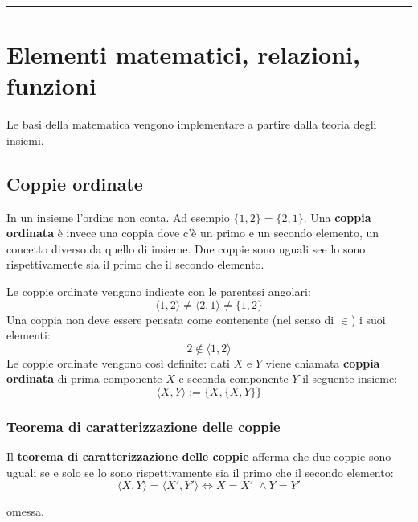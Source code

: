 \documentclass[
  a4paper,
]{article}
\begin{document}
\par\noindent\rule{\linewidth}{0.4pt}\par\vspace{6pt}

\newpage

\hypertarget{elementi-matematici-relazioni-funzioni}{%
\section{Elementi matematici, relazioni,
funzioni}\label{elementi-matematici-relazioni-funzioni}}

Le basi della matematica vengono implementare a partire dalla teoria
degli insiemi.

\hypertarget{coppie-ordinate}{%
\subsection{Coppie ordinate}\label{coppie-ordinate}}

In un insieme l'ordine non conta. Ad esempio \(\{1, 2\} = \{2, 1\}\).
Una \textbf{coppia ordinata} è invece una coppia dove c'è un primo e un
secondo elemento, un concetto diverso da quello di insieme. Due coppie
sono uguali see lo sono rispettivamente sia il primo che il secondo
elemento.

Le coppie ordinate vengono indicate con le parentesi angolari: \[
\langle 1, 2 \rangle \not = \langle 2, 1 \rangle \not = \{1, 2\}
\] Una coppia non deve essere pensata come contenente (nel senso di
\(\in\)) i suoi elementi: \[
2 \not \in \langle 1, 2 \rangle
\] Le coppie ordinate vengono così definite: dati \(X\) e \(Y\) viene
chiamata \textbf{coppia ordinata} di prima componente \(X\) e seconda
componente \(Y\) il seguente insieme: \[
\langle X, Y \rangle := \{X, \{X, Y\}\}
\]

\hypertarget{teorema-di-caratterizzazione-delle-coppie}{%
\subsubsection{Teorema di caratterizzazione delle
coppie}\label{teorema-di-caratterizzazione-delle-coppie}}

Il \textbf{teorema di caratterizzazione delle coppie} afferma che due
coppie sono uguali se e solo se lo sono rispettivamente sia il primo che
il secondo elemento: \[
\langle X, Y \rangle = \langle X', Y' \rangle \iff X = X' \; \land Y = Y'
\]

\begin{examplebox}[Dimostrazione]

omessa.

\end{examplebox}
\end{document}
